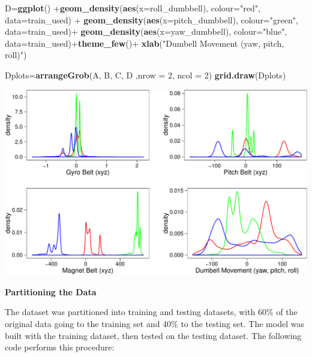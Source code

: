 \documentclass[]{article}
\newenvironment{Shaded}{\begin{snugshade}}{\end{snugshade}}
\newcommand{\KeywordTok}[1]{\textcolor[rgb]{0.13,0.29,0.53}{\textbf{{#1}}}}
\newcommand{\DataTypeTok}[1]{\textcolor[rgb]{0.13,0.29,0.53}{{#1}}}
\newcommand{\DecValTok}[1]{\textcolor[rgb]{0.00,0.00,0.81}{{#1}}}
\newcommand{\StringTok}[1]{\textcolor[rgb]{0.31,0.60,0.02}{{#1}}}
\newcommand{\NormalTok}[1]{{#1}}
\begin{document}
\begin{Shaded}
\begin{Highlighting}[]
\NormalTok{D=}\KeywordTok{ggplot}\NormalTok{() +}\KeywordTok{geom_density}\NormalTok{(}\KeywordTok{aes}\NormalTok{(}\DataTypeTok{x=}\NormalTok{roll_dumbbell), }\DataTypeTok{colour=}\StringTok{"red"}\NormalTok{, }\DataTypeTok{data=}\NormalTok{train_used) +}
\StringTok{  }\KeywordTok{geom_density}\NormalTok{(}\KeywordTok{aes}\NormalTok{(}\DataTypeTok{x=}\NormalTok{pitch_dumbbell), }\DataTypeTok{colour=}\StringTok{"green"}\NormalTok{, }\DataTypeTok{data=}\NormalTok{train_used)+}
\StringTok{  }\KeywordTok{geom_density}\NormalTok{(}\KeywordTok{aes}\NormalTok{(}\DataTypeTok{x=}\NormalTok{yaw_dumbbell), }\DataTypeTok{colour=}\StringTok{"blue"}\NormalTok{, }\DataTypeTok{data=}\NormalTok{train_used)+}\KeywordTok{theme_few}\NormalTok{()+}
\StringTok{  }\KeywordTok{xlab}\NormalTok{(}\StringTok{"Dumbell Movement (yaw, pitch, roll)"}\NormalTok{)}

\NormalTok{Dplots=}\KeywordTok{arrangeGrob}\NormalTok{(A, B, C, D ,}\DataTypeTok{nrow =} \DecValTok{2}\NormalTok{, }\DataTypeTok{ncol =} \DecValTok{2}\NormalTok{)}
\KeywordTok{grid.draw}\NormalTok{(Dplots)}
\end{Highlighting}
\end{Shaded}

\begin{center}\includegraphics{MLproject_files/figure-latex/unnamed-chunk-2-1} \end{center}

\textbf{Partitioning the Data}

The dataset was partitioned into training and testing datasets, with
60\% of the original data going to the training set and 40\% to the
testing set. The model was built with the training dataset, then tested
on the testing dataset. The following code performs this procedure:
\end{document}

